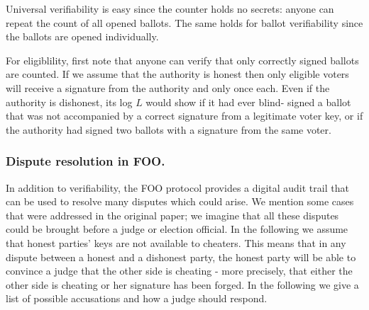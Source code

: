 \documentclass[envcountsame]{llncs}
\begin{document}
Universal verifiability is easy since the counter holds no secrets: anyone can
repeat the count of all opened ballots. The same holds for ballot verifiability
since the ballots are opened individually.

For eligiblility, first note that anyone can verify that only correctly signed
ballots are counted. If we assume that the authority is honest then only
eligible voters will receive a signature from the authority and only once each.
Even if the authority is dishonest, its log $L$ would show if it had ever blind-
signed a ballot that was not accompanied by a correct signature from a
legitimate voter key, or if the authority had signed two ballots with a
signature from the same voter.

\subsubsection{Dispute resolution in FOO.}

In addition to verifiability, the FOO protocol provides a digital audit trail
that can be used to resolve many disputes which could arise. We mention some
cases that were addressed in the original paper; we imagine that all these
disputes could be brought before a judge or election official.
In the following we assume that honest parties' keys are not available to
cheaters. This means that in any dispute between a honest and a dishonest party,
the honest party will be able to convince a judge that the other side is
cheating - more precisely, that either the other side is cheating or her
signature has been forged.
In the following we give a list of possible accusations and how a judge should
respond.
\end{document}
